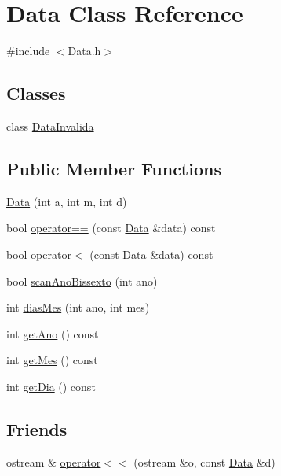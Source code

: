 \hypertarget{class_data}{}\section{Data Class Reference}
\label{class_data}


{\ttfamily \#include $<$Data.\+h$>$}

\subsection*{Classes}
\begin{DoxyCompactItemize}
\item 
class \hyperlink{class_data_1_1_data_invalida}{Data\+Invalida}
\end{DoxyCompactItemize}
\subsection*{Public Member Functions}
\begin{DoxyCompactItemize}
\item 
\hyperlink{class_data_af070d89007b1c6f4d80564b41f76716e}{Data} (int a, int m, int d)
\item 
bool \hyperlink{class_data_a682016837c60b8e801d4bcee3e694039}{operator==} (const \hyperlink{class_data}{Data} \&data) const 
\item 
bool \hyperlink{class_data_a54019a127c7262ad527e523b98ddd26a}{operator$<$} (const \hyperlink{class_data}{Data} \&data) const 
\item 
bool \hyperlink{class_data_a841974ad49226c9404572ba74f9e0e0b}{scan\+Ano\+Bissexto} (int ano)
\item 
int \hyperlink{class_data_a5c51ebb6bc3bef948910ee9c4211fa7c}{dias\+Mes} (int ano, int mes)
\item 
int \hyperlink{class_data_ad3981013cc47680fc4619063b7df4375}{get\+Ano} () const 
\item 
int \hyperlink{class_data_af73ca438bf53a0f386a6b1c03a6c0d3e}{get\+Mes} () const 
\item 
int \hyperlink{class_data_a56e5ac1591af52df4bc391d3c840cb07}{get\+Dia} () const 
\end{DoxyCompactItemize}
\subsection*{Friends}
\begin{DoxyCompactItemize}
\item 
ostream \& \hyperlink{class_data_a8ebf3d35facaad4039739437d2f9a8f3}{operator$<$$<$} (ostream \&o, const \hyperlink{class_data}{Data} \&d)
\end{DoxyCompactItemize}


